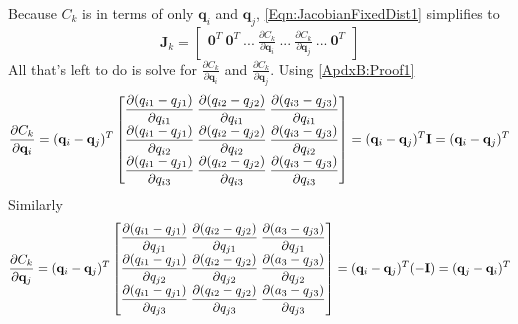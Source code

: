 Because $C_k$ is in terms of only $\mathbf{q}_i$ and $\mathbf{q}_j$,
\ref{Eqn:JacobianFixedDist1} simplifies to
\begin{equation}
    \label{Eqn:JacobianFixedDist2}
    \mathbf{J}_k = 
    \begin{bmatrix}
    \mathbf{0}^T\:
    \mathbf{0}^T\:
    ...\:
    \displaystyle\frac{\partial C_k}{\partial \mathbf{q}_i}\:
    ...\:
    \displaystyle\frac{\partial C_k}{\partial \mathbf{q}_j}\:
    ...\:
    \mathbf{0}^T
    \end{bmatrix}
\end{equation}  
All that's left to do is solve for $\displaystyle\frac{\partial C_k}{\partial \mathbf{q}_i}$ and
$\displaystyle\frac{\partial C_k}{\partial \mathbf{q}_j}$. 
Using \ref{ApdxB:Proof1}
\begin{equation}	
    \frac{\partial{C_k}}{\partial\mathbf{q}_i} = \\
    (\mathbf{q}_i-\mathbf{q}_j)^T
    \begin{bmatrix}
    \displaystyle\frac{\partial (q_{i1}-q_{j1})}{\partial q_{i1}} \: \displaystyle\frac{\partial (q_{i2}-q_{j2})}{\partial q_{i1}} \: \displaystyle\frac{\partial (q_{i3}-q_{j3})}{\partial q_{i1}}\\
    \displaystyle\frac{\partial (q_{i1}-q_{j1})}{\partial q_{i2}} \: \displaystyle\frac{\partial (q_{i2}-q_{j2})}{\partial q_{i2}} \: \displaystyle\frac{\partial (q_{i3}-q_{j3})}{\partial q_{i2}}\\
    \displaystyle\frac{\partial (q_{i1}-q_{j1})}{\partial q_{i3}} \: \displaystyle\frac{\partial (q_{i2}-q_{j2})}{\partial q_{i3}} \: \displaystyle\frac{\partial (q_{i3}-q_{j3})}{\partial q_{i3}}\\
    \end{bmatrix} = \\
    (\mathbf{q}_i - \mathbf{q}_j)^T \mathbf{I} = \\
    (\mathbf{q}_i - \mathbf{q}_j)^T
\end{equation}
Similarly
\begin{equation}
    \frac{\partial{C_k}}{\partial\mathbf{q}_j} = \\
    (\mathbf{q}_i-\mathbf{q}_j)^T
    \begin{bmatrix}
    \displaystyle\frac{\partial (q_{i1}-q_{j1})}{\partial q_{j1}} \: \displaystyle\frac{\partial (q_{i2}-q_{j2})}{\partial q_{j1}} \: \displaystyle\frac{\partial (a_3-q_{j3})}{\partial q_{j1}}\\
    \displaystyle\frac{\partial (q_{i1}-q_{j1})}{\partial q_{j2}} \: \displaystyle\frac{\partial (q_{i2}-q_{j2})}{\partial q_{j2}} \: \displaystyle\frac{\partial (a_3-q_{j3})}{\partial q_{j2}}\\
    \displaystyle\frac{\partial (q_{i1}-q_{j1})}{\partial q_{j3}} \: \displaystyle\frac{\partial (q_{i2}-q_{j2})}{\partial q_{j3}} \: \displaystyle\frac{\partial (a_3-q_{j3})}{\partial q_{j3}}\\
    \end{bmatrix} = \\
    (\mathbf{q}_i - \mathbf{q}_j)^T (-\mathbf{I}) = \\
    (\mathbf{q}_j - \mathbf{q}_i)^T
\end{equation}
